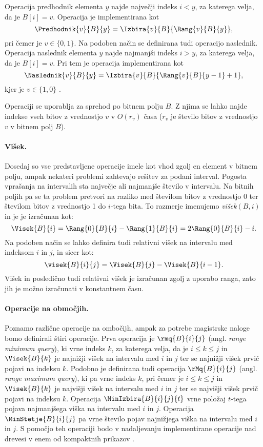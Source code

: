 Operacija predhodnik elementa $y$ najde največji indeks $i<y$, za katerega velja, da je $B[i]=v$. Operacija je implementirana kot
    $$\Predhodnik{v}{B}{y}=\Izbira{v}{B}{\Rang{v}{B}{y}},$$
pri čemer je $v\in \{0,1\}$. Na podoben način se definirana tudi operacijo naslednik. Operacija naslednik elementa $y$ najde najmanjši indeks $i>y$, za katerega velja, da je $B[i]=v$. Pri tem je operacija implementirana kot
    $$\Naslednik{v}{B}{y}=\Izbira{v}{B}{\Rang{v}{B}{y-1}+1},$$
kjer je $v\in \{1,0\}$ \cite{Navarro2016}.

Operaciji se uporablja za sprehod po bitnem polju $B$. Z njima se lahko najde indekse vseh bitov z vrednostjo $v$ v $O(r_v)$ časa ($r_v$ je število bitov z vrednostjo $v$ v bitnem polj $B$).

\paragraph{Višek.}
Dosedaj so vse predstavljene operacije imele kot vhod zgolj en element v bitnem polju, ampak nekateri problemi zahtevajo rešitev za podani interval. Pogosta vprašanja na intervalih sta največje ali najmanjše število v intervalu. Na bitnih poljih pa se ta problem pretvori na razliko med številom bitov z vrednostjo 0 ter številom bitov z vrednostjo 1 do $i$-tega bita. To razmerje imenujemo \textit{višek}$(B,i)$ in je je izračunan kot:
$$
    \Visek{B}{i}=\Rang{0}{B}{i}-\Rang{1}{B}{i}=2\Rang{0}{B}{i}-i.
$$
Na podoben način se lahko definira tudi relativni višek na intervalu med indeksom $i$ in $j$, in sicer kot:
$$
    \visek{B}{i}{j}=\Visek{B}{j}-\Visek{B}{i-1}.
$$
Višek in posledično tudi relativni višek je izračunan zgolj z uporabo ranga, zato jih je možno izračunati v konstantnem času.

\paragraph{Operacije na območjih.}
Poznamo različne operacije na ombočijh, ampak za potrebe magistrske naloge bomo definirali štiri operacije.
Prva operacija je $\rmq{B}{i}{j}$ (angl. \textit{range minimum query}), ki vrne indeks $k$, za katerega velja, da je $i\le k\le j$ in $\Visek{B}{k}$ je najnižji višek na intervalu med $i$ in $j$ ter se najnižji višek prvič pojavi na indeksu $k$. Podobno je definirana tudi operacija $\rMq{B}{i}{j}$ (angl. \textit{range maximum query}), ki pa vrne indeks $k$, pri čemer je $i\le k\le j$ in $\Visek{B}{k}$ je najvišji višek na intervalu med $i$ in $j$ ter se najvišji višek prvič pojavi na indeksu $k$. Operacija $\MinIzbira{B}{i}{j}{t}$ vrne položaj $t$-tega pojava najmanjšega viška na intervalu med $i$ in $j$. Operacija $\MinStetje{B}{i}{j}$ pa vrne število pojav najnižjega viška na intervalu med $i$ in $j$. S pomočjo teh operaciji bodo v nadaljevanju implementirane operacije nad drevesi v enem od kompaktnih prikazov \cite{Navarro2016}.


